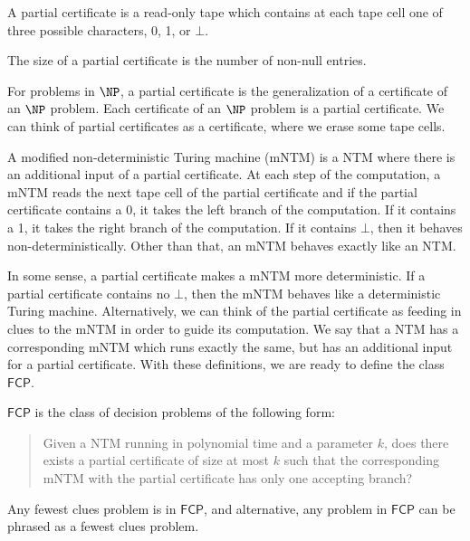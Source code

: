 \documentclass[runningheads,a4paper]{llncs}
\begin{document}
\begin{definition}
A partial certificate is a read-only tape which contains at each tape cell one of three possible characters, 0, 1, or $\bot$.
\end{definition}

\begin{definition}
The size of a partial certificate is the number of non-null entries. 
\end{definition}

For problems in $\NP$, a partial certificate is the generalization of a certificate of an $\NP$ problem. Each certificate of an $\NP$ problem is a partial certificate. We can think of partial certificates as a certificate, where we erase some tape cells.

\begin{definition}
A modified non-deterministic Turing machine (mNTM) is a NTM where there is an additional input of a partial certificate. At each step of the computation, a mNTM reads the next tape cell of the partial certificate and if the partial certificate contains a 0, it takes the left branch of the computation. If it contains a 1, it takes the right branch of the computation. If it contains $\bot$, then it behaves non-deterministically. Other than that, an mNTM behaves exactly like an NTM.
\end{definition}

In some sense, a partial certificate makes a mNTM more deterministic. If a partial certificate contains no $\bot$, then the mNTM behaves like a deterministic Turing machine. Alternatively, we can think of the partial certificate as feeding in clues to the mNTM in order to guide its computation. We say that a NTM has a corresponding mNTM which runs exactly the same, but has an additional input for a partial certificate. With these definitions, we are ready to define the class $\mathsf{FCP}$.

\begin{definition}
$\mathsf{FCP}$ is the class of decision problems of the following form:\\
\begin{quote}
Given a NTM running in polynomial time and a parameter $k$, does there exists a partial certificate of size at most $k$ such that the corresponding mNTM with the partial certificate has only one accepting branch?
\end{quote}
\end{definition}

\begin{proposition}
Any fewest clues problem is in $\mathsf{FCP}$, and alternative, any problem in $\mathsf{FCP}$ can be phrased as a fewest clues problem.
\end{proposition}
\end{document}
